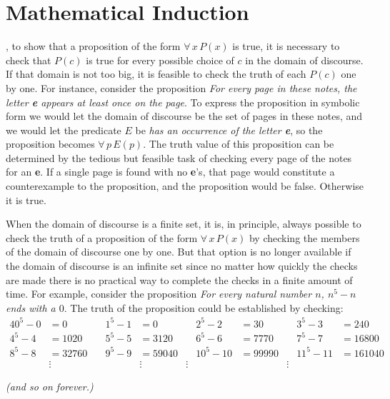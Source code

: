 \newcommand{\cent}{{\mathrm{c}\mkern-9.0mu{/}}} %
\chapter{Mathematical Induction}


, to show that a proposition of
the form $\forall\,x\,P(x)$ is true, it is necessary to check that $P(c)$ is true
for every possible choice of $c$ in the domain of discourse. If that domain 
is not too big, it is feasible to check the truth of each $P(c)$ one by
one. For instance, consider the proposition {\it For every page in 
these notes,
the letter {\bfseries e} appears at least once on the page}. To express the 
proposition
in symbolic form we would let the domain of discourse be the set of pages in 
these
notes, and we would let the predicate $E$ be {\it has an occurrence of the
letter {\bfseries e}}, so the proposition becomes $\forall\,p\,E(p)$. The truth 
value of
this proposition can be determined by the tedious but feasible task of checking
every page of the notes for an {\bfseries e}. If a single page is found with no {\bf
e}'s, that page would constitute a counterexample to the proposition, and the
proposition would be false. Otherwise it is true.

When the domain of discourse is a finite set, it is, in principle, always
possible to check the truth of a proposition of the form $\forall\,x\,P(x)$ by
checking the members of the domain of discourse one by one. But that option is
no longer available if the domain of discourse is an infinite set since no
matter how quickly the checks are made there is no practical way to complete the
checks in a finite amount of time. For example, consider the proposition 
{\itshape For every natural number $n$, $n^5-n$ ends with a $0$}.%
%
The truth of the proposition could be established by checking: 
\begin{alignat*}{4}
 0^5-0 &= 0     &\quad 1^5-1 &= 0     &\quad 2^5-2   &=30     &\quad 3^5-3       &=240    \\
 4^5-4 &= 1020 &\quad 5^5-5  &= 3120  &\quad 6^5-6   &= 7770  &\quad 7^5-7    &=16800  \\
 8^5-8 &=32760 &\quad 9^5-9  &= 59040 &\quad 10^5-10 &= 99990 &\quad 11^5-11 &=161040 \\
 &\vdots&&\vdots&\vdots&&\vdots&
\end{alignat*}
\begin{center}
\itshape (and so on forever.)
\end{center}


